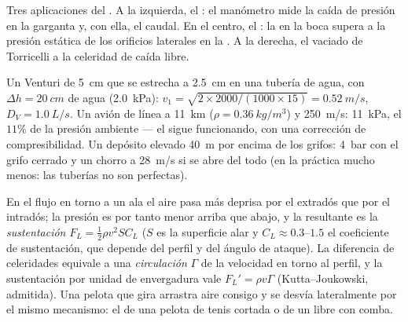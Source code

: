 \begin{omfigure}
{\small Tres aplicaciones del . A la izquierda, el
: el manómetro mide la caída de presión en la garganta y,
con ella, el caudal. En el centro, el : la  en la boca supera a la presión estática de los orificios
laterales en la . A la derecha, el vaciado de Torricelli a
la celeridad de caída libre.}
\end{omfigure}

\begin{example}\label{ex:b2:euler-bernoulli:numbers}
Un Venturi de \qty{5}{cm} que se estrecha a \qty{2.5}{cm} en una tubería de
agua, con $\Delta h = \qty{20}{cm}$ de agua (\qty{2.0}{kPa}): $v_1 = \sqrt{2 \times 2000/
(1000 \times 15)} = \qty{0.52}{m/s}$, $D_V = \qty{1.0}{L/s}$. Un avión de
línea a \qty{11}{km} ($\rho = \qty{0.36}{kg/m^3}$) y \qty{250}{m/s}:  \qty{11}{kPa}, el $11\%$ de la presión ambiente --- el  sigue funcionando, con una corrección de compresibilidad. Un
depósito elevado \qty{40}{m} por encima de los grifos: \qty{4}{bar} con el
grifo cerrado y un chorro a \qty{28}{m/s} si se abre del todo (en la
práctica mucho menos: las tuberías no son perfectas).
\end{example}

\begin{proposition}\label{prop:b2:euler-bernoulli:lift}
En el flujo en torno a un ala el aire pasa más deprisa por el extradós que
por el intradós; la presión es por tanto menor arriba que abajo, y la
resultante es la \emph{sustentación} $F_L =
\tfrac12\rho v^2SC_L$ ($S$ es la superficie alar y $C_L \approx 0.3$--$1.5$
el coeficiente de sustentación, que depende del perfil y del ángulo de
ataque). La diferencia de celeridades equivale a una \emph{circulación}
$\Gamma$ de la velocidad en torno al perfil, y la sustentación por unidad
de envergadura vale $F_L' =
\rho v\Gamma$ (Kutta--Joukowski, admitida). Una pelota que gira arrastra
aire consigo y se desvía lateralmente por el mismo mecanismo: el
\emph{} de una pelota de tenis cortada o de un libre con comba.
\end{proposition}

